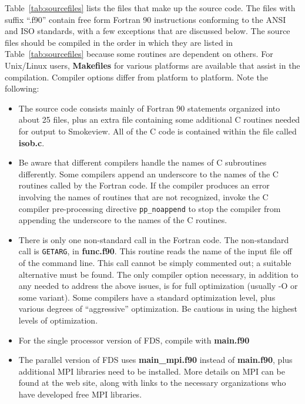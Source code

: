 \documentclass[11pt]{book}
\newcommand{\ct}{\tt\small}
\begin{document}
Table~\ref{tab:sourcefiles} lists the files that make up the source code.
The files with suffix ``.f90'' contain free form Fortran 90
instructions conforming to the ANSI and ISO standards, with a few exceptions that are discussed below.
The source files should be compiled in the order in which they are listed
in Table~\ref{tab:sourcefiles} because some routines are dependent on others.
For Unix/Linux users, {\bf Makefiles} for various platforms are available that assist in the
compilation. Compiler options differ from platform to platform.
Note the following:
\begin{itemize}
\item The source code consists mainly of Fortran 90
statements organized into about 25 files, plus an extra file containing
some additional C routines needed for output to Smokeview.
All of the C code is contained within the file called {\bf isob.c}.
\item Be aware that different
compilers handle the names of C subroutines differently. Some compilers
append an underscore to the names of the C routines called by the Fortran
code. If the compiler produces an error involving the names of routines
that are not recognized, invoke the C compiler pre-processing directive {\ct pp\_noappend} to stop
the compiler from appending the underscore to the names of the C routines.
\item There is only one non-standard call in the Fortran code. The non-standard call is {\ct GETARG},
in {\bf func.f90}. This routine reads the name of the input file off of the command line. This call cannot
be simply commented out; a suitable alternative must be found.
The only compiler option necessary, in addition to any needed to
address the above issues, is for full optimization (usually -O or some variant). Some
compilers have a standard optimization level, plus various degrees of
``aggressive'' optimization. Be cautious in using the highest levels of optimization.
\item For the single processor version of FDS, compile with {\bf main.f90}
\item The parallel version of FDS uses {\bf main\_mpi.f90} instead of
{\bf main.f90}, plus additional MPI libraries need to be installed. More details on MPI can be found at the web site, along with links to the
necessary organizations who have developed free MPI libraries.
\end{itemize}
\end{document}
